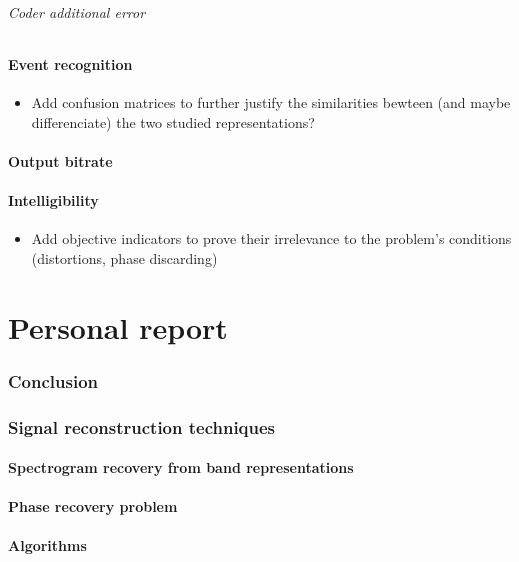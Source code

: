 \documentclass[12pt,times,onecolumn]{article}
\begin{document}
\paragraph{Coder additional error}
\subsection{Event recognition}
\begin{itemize}
\item Add confusion matrices to further justify the similarities bewteen (and maybe differenciate) the two studied representations?
\end{itemize}
\subsection{Output bitrate}
\subsection{Intelligibility}
\begin{itemize}
\item Add objective indicators to prove their irrelevance to the problem's conditions (distortions, phase discarding)
\end{itemize}

\clearpage
\part{Personal report}
\clearpage
\section*{Conclusion}

\clearpage
\appendix
\section{Signal reconstruction techniques}
\subsection{Spectrogram recovery from band representations}
\subsection{Phase recovery problem}
\subsection{Algorithms}



\end{document}
